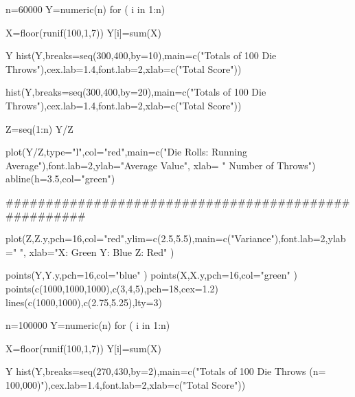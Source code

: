





n=60000
Y=numeric(n)
for ( i in 1:n){

X=floor(runif(100,1,7))
Y[i]=sum(X)
}

Y
hist(Y,breaks=seq(300,400,by=10),main=c("Totals of 100 Die Throws"),cex.lab=1.4,font.lab=2,xlab=c("Total Score"))

hist(Y,breaks=seq(300,400,by=20),main=c("Totals of 100 Die Throws"),cex.lab=1.4,font.lab=2,xlab=c("Total Score"))



Z=seq(1:n)
Y/Z

plot(Y/Z,type="l",col="red",main=c("Die Rolls: Running Average"),font.lab=2,ylab="Average Value", xlab=
" Number of Throws")
abline(h=3.5,col="green")


#####################################################

plot(Z,Z.y,pch=16,col="red",ylim=c(2.5,5.5),main=c("Variance"),font.lab=2,ylab=" ", xlab="X: Green  Y: Blue  Z: Red" )

points(Y,Y.y,pch=16,col="blue" )
points(X,X.y,pch=16,col="green" )
points(c(1000,1000,1000),c(3,4,5),pch=18,cex=1.2)
lines(c(1000,1000),c(2.75,5.25),lty=3)



n=100000
Y=numeric(n)
for ( i in 1:n){

X=floor(runif(100,1,7))
Y[i]=sum(X)
}

Y
hist(Y,breaks=seq(270,430,by=2),main=c("Totals of 100 Die Throws (n= 100,000)"),cex.lab=1.4,font.lab=2,xlab=c("Total Score")) 
